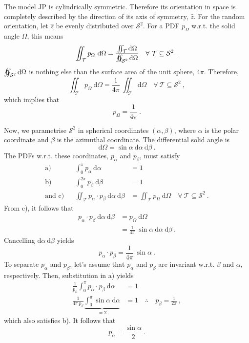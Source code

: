 \documentclass[10pt]{article}
\begin{document}
The model JP is cylindrically symmetric. Therefore its orientation in space is completely described by the direction of its axis of symmetry, $\hat{z}$. 
For the random orientation, let $\hat{z}$ be evenly distributed over $\mathcal{S}^2$. 
For a PDF $p_\Omega$ w.r.t. the solid angle $\Omega$, this means
$$
\iint_{\mathcal{T}} p_\Omega \ \mathrm{d}\Omega
=
\frac{
\iint_{\mathcal{T}} \mathrm{d}\Omega
}{
\varoiint_{\mathcal{S}^2} \mathrm{d}\Omega
}
\quad\forall\ \mathcal{T}\subseteq\mathcal{S}^2
\ .
$$
$\varoiint_{\mathcal{S}^2} \mathrm{d}\Omega$ is nothing else than the surface area of the unit sphere, $4\pi$. 
Therefore, 
$$
\iint_{\mathcal{T}} p_\Omega \ \mathrm{d}\Omega
=
\frac{1}{4\pi}\ 
\iint_{\mathcal{T}} \mathrm{d}\Omega
\quad\forall\ \mathcal{T}\subseteq\mathcal{S}^2
\ ,
$$
which implies that
$$
p_\Omega=\frac{1}{4\pi}\ .
$$

Now, we parametrise $\mathcal{S}^2$ in spherical coordinates $(\alpha,\beta)$, where $\alpha$ is the polar coordinate and $\beta$ is the azimuthal coordinate. 
The differential solid angle is
$$
\mathrm{d}\Omega = \sin\alpha \ \mathrm{d}\alpha \ \mathrm{d}\beta \ .
$$
The PDFs w.r.t. these coordinates, $p_{\alpha}$ and $p_\beta$, must satisfy
$$
\begin{aligned}
\text{a)}&&
\int_0^\pi p_{\alpha} \ \mathrm{d}\alpha &= 1
\\
\text{b)}&&
\int_0^{2\pi} p_{\beta} \ \mathrm{d}\beta &= 1
\\
\text{and c)}&&
\iint_{\mathcal{T}} p_\alpha \cdot p_\beta \ \mathrm{d}\alpha\ \mathrm{d}\beta
&=
\iint_{\mathcal{T}} p_\Omega \ \mathrm{d}\Omega
\quad\forall\ \mathcal{T}\subseteq\mathcal{S}^2
\ .
\end{aligned}
$$
From \mbox{c)}, it follows that
$$
\begin{aligned}
p_\alpha \cdot p_\beta \ \mathrm{d}\alpha\ \mathrm{d}\beta &= p_\Omega \ \mathrm{d}\Omega
\\
&= \frac{1}{4\pi} \ \sin\alpha \ \mathrm{d}\alpha \ \mathrm{d}\beta \ .
\end{aligned}
$$
Cancelling $\mathrm{d}\alpha\ \mathrm{d}\beta$ yields
$$
p_\alpha \cdot p_\beta = \frac{1}{4\pi} \ \sin\alpha \ .
$$
To separate $p_\alpha$ and $p_\beta$, let's assume that $p_\alpha$ and $p_\beta$ are invariant w.r.t. $\beta$ and $\alpha$, respectively. 
Then, substitution in \mbox{a)} yields
$$
\begin{aligned}
\frac{1}{p_\beta} \int_0^\pi p_\alpha \cdot p_\beta \ \mathrm{d}\alpha &= 1
\\
\frac{1}{4\pi\ p_\beta} \underbrace{\int_0^\pi \sin\alpha \ \mathrm{d}\alpha}_{=2} &= 1
\quad\therefore\quad
p_\beta = \frac{1}{2\pi}
\ ,
\end{aligned}
$$
which also satisfies \mbox{b)}. 
It follows that 
$$p_\alpha = \frac{\sin\alpha}{2} \ .$$
\end{document}
